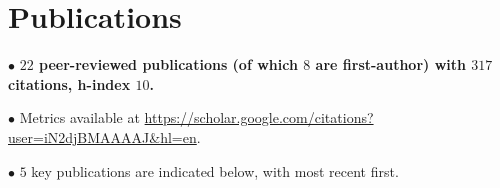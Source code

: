 \documentclass[11pt,letterpaper,sans]{moderncv} %
\begin{document}

\vspace{-2.5mm}
\section{Publications}

$\bullet$ \textbf{$22$ peer-reviewed publications (of which $8$ are first-author) with $317$ citations, h-index $10$.} 

$\bullet$ Metrics available at \url{https://scholar.google.com/citations?user=iN2djBMAAAAJ&hl=en}.

$\bullet$ $5$ key publications are indicated below, with most recent first.
\end{document}
